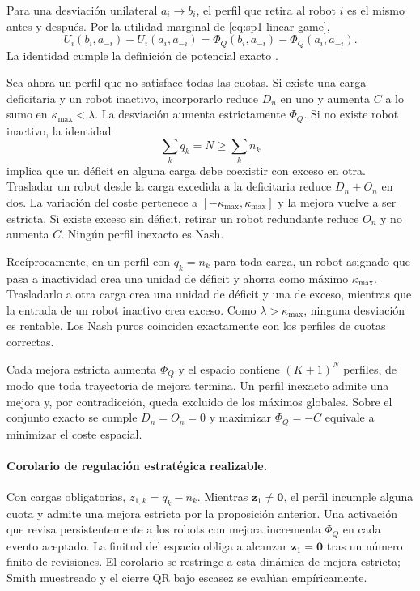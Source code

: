 Para una desviación unilateral $a_i\to b_i$, el perfil que retira al robot $i$ es el mismo antes y después. Por la utilidad marginal de \eqref{eq:sp1-linear-game},
\[
 U_i(b_i,a_{-i})-U_i(a_i,a_{-i})
 =\Phi_Q(b_i,a_{-i})-\Phi_Q(a_i,a_{-i}).
\]
La identidad cumple la definición de potencial exacto \parencite{monderer1996potential}.

Sea ahora un perfil que no satisface todas las cuotas. Si existe una carga deficitaria y un robot inactivo, incorporarlo reduce $D_n$ en uno y aumenta $C$ a lo sumo en $\kappa_{\max}<\lambda$. La desviación aumenta estrictamente $\Phi_Q$. Si no existe robot inactivo, la identidad
\[
 \sum_kq_k=N\geq\sum_kn_k
\]
implica que un déficit en alguna carga debe coexistir con exceso en otra. Trasladar un robot desde la carga excedida a la deficitaria reduce $D_n+O_n$ en dos. La variación del coste pertenece a $[-\kappa_{\max},\kappa_{\max}]$ y la mejora vuelve a ser estricta. Si existe exceso sin déficit, retirar un robot redundante reduce $O_n$ y no aumenta $C$. Ningún perfil inexacto es Nash.

Recíprocamente, en un perfil con $q_k=n_k$ para toda carga, un robot asignado que pasa a inactividad crea una unidad de déficit y ahorra como máximo $\kappa_{\max}$. Trasladarlo a otra carga crea una unidad de déficit y una de exceso, mientras que la entrada de un robot inactivo crea exceso. Como $\lambda>\kappa_{\max}$, ninguna desviación es rentable. Los Nash puros coinciden exactamente con los perfiles de cuotas correctas.

Cada mejora estricta aumenta $\Phi_Q$ y el espacio contiene $(K+1)^N$ perfiles, de modo que toda trayectoria de mejora termina. Un perfil inexacto admite una mejora y, por contradicción, queda excluido de los máximos globales. Sobre el conjunto exacto se cumple $D_n=O_n=0$ y maximizar $\Phi_Q=-C$ equivale a minimizar el coste espacial.

\paragraph{Corolario de regulación estratégica realizable.}
Con cargas obligatorias, $z_{1,k}=q_k-n_k$. Mientras $\boldsymbol z_1\neq\boldsymbol0$, el perfil incumple alguna cuota y admite una mejora estricta por la proposición anterior. Una activación que revisa persistentemente a los robots con mejora incrementa $\Phi_Q$ en cada evento aceptado. La finitud del espacio obliga a alcanzar $\boldsymbol z_1=\boldsymbol0$ tras un número finito de revisiones. El corolario se restringe a esta dinámica de mejora estricta; Smith muestreado y el cierre QR bajo escasez se evalúan empíricamente.

